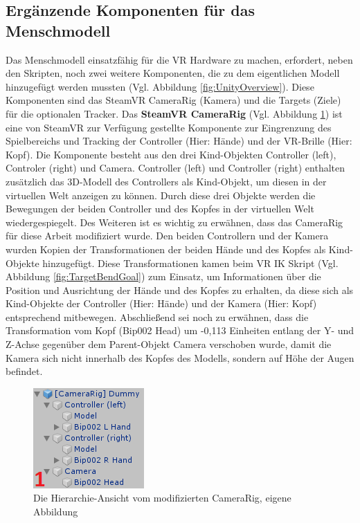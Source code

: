 \subsection{Ergänzende Komponenten für das Menschmodell}\label{sec:MMKomponenten}
Das Menschmodell einsatzfähig für die VR Hardware zu machen, erfordert, neben den Skripten, noch zwei weitere Komponenten, die zu dem eigentlichen Modell hinzugefügt werden mussten (Vgl. Abbildung \ref{fig:UnityOverview}). Diese Komponenten sind das SteamVR CameraRig (Kamera) und die Targets (Ziele) für die optionalen Tracker.
\newline\newline
Das \textbf{SteamVR CameraRig} (Vgl. Abbildung \ref{fig:CameraRig}) ist eine von SteamVR zur Verfügung gestellte Komponente zur Eingrenzung des Spielbereichs und Tracking der Controller (Hier: Hände) und der VR-Brille (Hier: Kopf). Die Komponente besteht aus den drei Kind-Objekten Controller (left), Controler (right) und Camera. Controller (left) und Controller (right) enthalten zusätzlich das 3D-Modell des Controllers als Kind-Objekt, um diesen in der virtuellen Welt anzeigen zu können. Durch diese drei Objekte werden die Bewegungen der beiden Controller und des Kopfes in der virtuellen Welt wiedergespiegelt. Des Weiteren ist es wichtig zu erwähnen, dass das CameraRig für diese Arbeit modifiziert wurde. Den beiden Controllern und der Kamera wurden Kopien der Transformationen der beiden Hände und des Kopfes als Kind-Objekte hinzugefügt. Diese Transformationen kamen beim VR IK Skript (Vgl. Abbildung \ref{fig:TargetBendGoal}) zum Einsatz, um Informationen über die Position und Ausrichtung der Hände und des Kopfes zu erhalten, da diese sich als Kind-Objekte der Controller (Hier: Hände) und der Kamera (Hier: Kopf) entsprechend mitbewegen. Abschließend sei noch zu erwähnen, dass die Transformation vom Kopf (Bip002 Head) um -0,113 Einheiten entlang der Y- und Z-Achse gegenüber dem Parent-Objekt Camera verschoben wurde, damit die Kamera sich nicht innerhalb des Kopfes des Modells, sondern auf Höhe der Augen befindet.
\begin{figure}[h]
	\centering
	\includegraphics[width=0.25\linewidth]{Bilder/A37_CameraRig2}
	\caption{Die Hierarchie-Ansicht vom modifizierten CameraRig, eigene Abbildung}
	\label{fig:CameraRig}
\end{figure}
